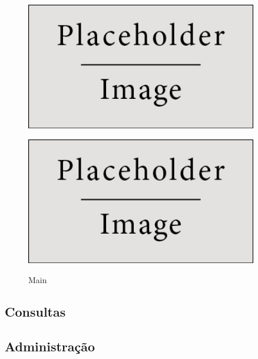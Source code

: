 \documentclass[11pt,twoside,a4paper]{report}
\begin{document}
\begin{figure}[H]
	\centering
	\begin{minipage}{.5\textwidth}
		\begin{center}
			\includegraphics[width=0.9\textwidth]{placeholder} %
			\label{fig:login2}
		\end{center}
	\end{minipage}%
	\begin{minipage}{.5\textwidth}
		\begin{center}
			\includegraphics[width=0.9\textwidth]{placeholder} %
			\label{fig:login3}
		\end{center}
	\end{minipage}
	\caption{Main}
	\label{fig:login1}
\end{figure}

\subsection{Consultas}

\subsection{Administração}
\end{document}
